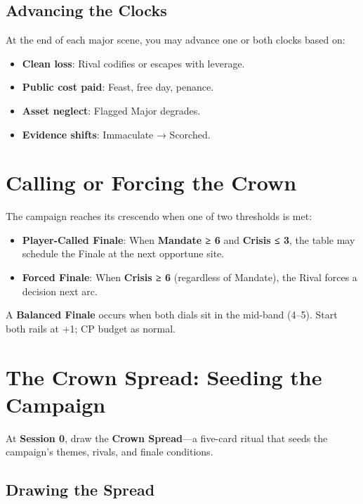 \subsection*{Advancing the Clocks}

At the end of each major scene, you may advance one or both clocks based on:

\begin{itemize}
    \item \textbf{Clean loss}: Rival codifies or escapes with leverage.
    \item \textbf{Public cost paid}: Feast, free day, penance.
    \item \textbf{Asset neglect}: Flagged Major degrades.
    \item \textbf{Evidence shifts}: Immaculate → Scorched.
\end{itemize}

\section*{Calling or Forcing the Crown}

The campaign reaches its crescendo when one of two thresholds is met:

\begin{itemize}
    \item \textbf{Player-Called Finale}: When \textbf{Mandate ≥ 6} and \textbf{Crisis ≤ 3}, the table may schedule the Finale at the next opportune site.
    \item \textbf{Forced Finale}: When \textbf{Crisis ≥ 6} (regardless of Mandate), the Rival forces a decision next arc.
\end{itemize}

A \textbf{Balanced Finale} occurs when both dials sit in the mid-band (4–5). Start both rails at +1; CP budget as normal.

\section*{The Crown Spread: Seeding the Campaign}

At \textbf{Session 0}, draw the \textbf{Crown Spread}—a five-card ritual that seeds the campaign’s themes, rivals, and finale conditions.

\subsection*{Drawing the Spread}

